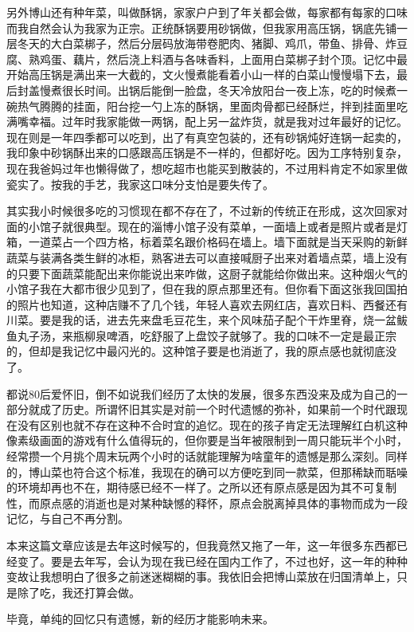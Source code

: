 \documentclass[
]{book}
\begin{document}
另外博山还有种年菜，叫做酥锅，家家户户到了年关都会做，每家都有每家的口味而我自然会认为我家为正宗。正统酥锅要用砂锅做，但我家用高压锅，锅底先铺一层冬天的大白菜梆子，然后分层码放海带卷肥肉、猪脚、鸡爪，带鱼、排骨、炸豆腐、熟鸡蛋、藕片，然后浇上料酒与各味香料，上面用白菜梆子封个顶。记忆中最开始高压锅是满出来一大截的，文火慢煮能看着小山一样的白菜山慢慢塌下去，最后封盖慢煮很长时间。出锅后能倒一脸盘，冬天冷放阳台一夜上冻，吃的时候煮一碗热气腾腾的挂面，阳台挖一勺上冻的酥锅，里面肉骨都已经酥烂，拌到挂面里吃满嘴幸福。过年时我家能做一两锅，配上另一盆炸货，就是我对过年最好的记忆。现在则是一年四季都可以吃到，出了有真空包装的，还有砂锅炖好连锅一起卖的，我印象中砂锅酥出来的口感跟高压锅是不一样的，但都好吃。因为工序特别复杂，现在我爸妈过年也懒得做了，想吃超市也能买到散装的，不过用料肯定不如家里做瓷实了。按我的手艺，我家这口味分支怕是要失传了。

其实我小时候很多吃的习惯现在都不存在了，不过新的传统正在形成，这次回家对面的小馆子就很典型。现在的淄博小馆子没有菜单，一面墙上或者是照片或者是灯箱，一道菜占一个四方格，标着菜名跟价格码在墙上。墙下面就是当天采购的新鲜蔬菜与装满各类生鲜的冰柜，熟客进去可以直接喊厨子出来对着墙点菜，墙上没有的只要下面蔬菜能配出来你能说出来咋做，这厨子就能给你做出来。这种烟火气的小馆子我在大都市很少见到了，但在我的原点那里还有。但你看下面这张我回国拍的照片也知道，这种店赚不了几个钱，年轻人喜欢去网红店，喜欢日料、西餐还有川菜。要是我的话，进去先来盘毛豆花生，来个风味茄子配个干炸里脊，烧一盆鲅鱼丸子汤，来瓶柳泉啤酒，吃舒服了上盘饺子就够了。我的口味不一定是最正宗的，但却是我记忆中最闪光的。这种馆子要是也消逝了，我的原点感也就彻底没了。

都说80后爱怀旧，倒不如说我们经历了太快的发展，很多东西没来及成为自己的一部分就成了历史。所谓怀旧其实是对前一个时代遗憾的弥补，如果前一个时代跟现在没有区别也就不存在这种不合时宜的追忆。现在的孩子肯定无法理解红白机这种像素级画面的游戏有什么值得玩的，但你要是当年被限制到一周只能玩半个小时，经常攒一个月挑个周末玩两个小时的话就能理解为啥童年的遗憾是那么深刻。同样的，博山菜也符合这个标准，我现在的确可以方便吃到同一款菜，但那稀缺而聒噪的环境却再也不在，期待感已经不一样了。之所以还有原点感是因为其不可复制性，而原点感的消逝也是对某种缺憾的释怀，原点会脱离掉具体的事物而成为一段记忆，与自己不再分割。

本来这篇文章应该是去年这时候写的，但我竟然又拖了一年，这一年很多东西都已经变了。要是去年写，会认为现在我已经在国内工作了，不过也好，这一年的种种变故让我想明白了很多之前迷迷糊糊的事。我依旧会把博山菜放在归国清单上，只是除了吃，我还打算会做。

毕竟，单纯的回忆只有遗憾，新的经历才能影响未来。
\end{document}
